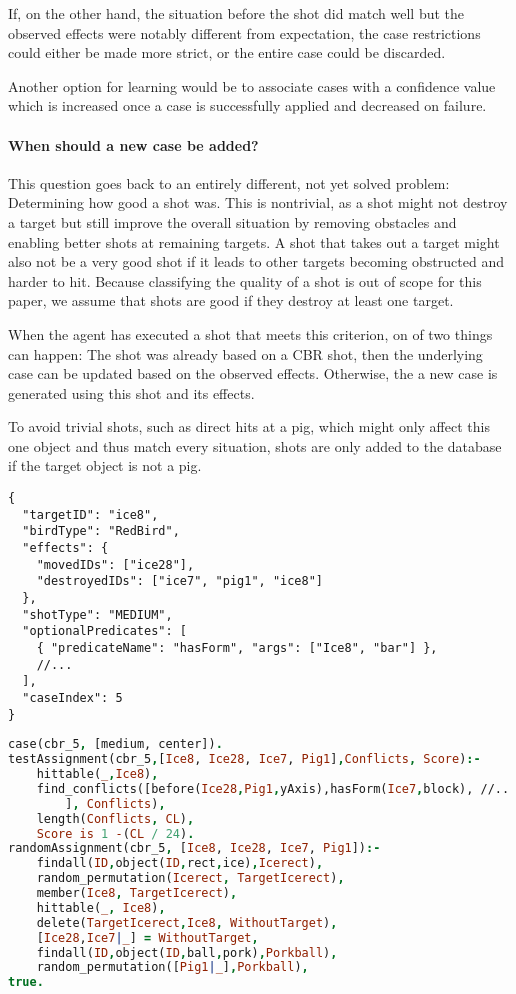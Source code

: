 If, on the other hand, the situation before the shot did match well but the observed effects were notably different from expectation, the case restrictions could either be made more strict, or the entire case could be discarded.

Another option for learning would be to associate cases with a confidence value which is increased once a case is successfully applied and decreased on failure.

\paragraph{When should a new case be added?}
This question goes back to an entirely different, not yet solved problem: Determining how good a shot was.
This is nontrivial, as a shot might not destroy a target but still improve the overall situation by removing obstacles and enabling better shots at remaining targets.
A shot that takes out a target might also not be a very good shot if it leads to other targets becoming obstructed and harder to hit.
Because classifying the quality of a shot is out of scope for this paper, we assume that shots are good if they destroy at least one target.

When the agent has executed a shot that meets this criterion, on of two things can happen: The shot was already based on a \ac{CBR} shot, then the underlying case can be updated based on the observed effects. Otherwise, the a new case is generated using this shot and its effects.

To avoid trivial shots, such as direct hits at a pig, which might only affect this one object and thus match every situation, shots are only added to the database if the target object is not a pig.

\begin{lstlisting}[caption=case information outside of Prolog]
{
  "targetID": "ice8",
  "birdType": "RedBird",
  "effects": {
    "movedIDs": ["ice28"],
    "destroyedIDs": ["ice7", "pig1", "ice8"]
  },
  "shotType": "MEDIUM",
  "optionalPredicates": [
    { "predicateName": "hasForm", "args": ["Ice8", "bar"] },
    //...
  ],
  "caseIndex": 5
}    
\end{lstlisting}

\begin{lstlisting}[label=lst:case-prolog, language=Prolog, caption=case information in Prolog]
case(cbr_5, [medium, center]).
testAssignment(cbr_5,[Ice8, Ice28, Ice7, Pig1],Conflicts, Score):-
    hittable(_,Ice8),
    find_conflicts([before(Ice28,Pig1,yAxis),hasForm(Ice7,block), //...
        ], Conflicts),
    length(Conflicts, CL),
    Score is 1 -(CL / 24).
randomAssignment(cbr_5, [Ice8, Ice28, Ice7, Pig1]):-
    findall(ID,object(ID,rect,ice),Icerect),
    random_permutation(Icerect, TargetIcerect),
    member(Ice8, TargetIcerect),
    hittable(_, Ice8),
    delete(TargetIcerect,Ice8, WithoutTarget),
    [Ice28,Ice7|_] = WithoutTarget,
    findall(ID,object(ID,ball,pork),Porkball),
    random_permutation([Pig1|_],Porkball),
true.
\end{lstlisting}